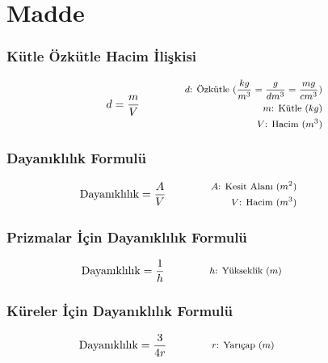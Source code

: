 \section{Madde}

\subsubsection*{Kütle Özkütle Hacim İlişkisi}

\begin{equation}
    d = \frac{m}{V} \qquad \qquad \parbox{4cm}{\footnotesize$
    \begin{aligned}
        d\text{: Özkütle } (\frac{kg}{m^3} = \frac{g}{dm^3} = \frac{mg}{cm^3}) \\
        m\text{: Kütle } (kg) \\
        V\text{: Hacim } (m^3)
    \end{aligned}$}
\end{equation}

\subsubsection*{Dayanıklılık Formulü}

\begin{equation}
    \text{Dayanıklılık} = \frac{A}{V} \qquad \qquad \parbox{4cm}{\footnotesize$
      \begin{aligned}
        A\text{: Kesit Alanı } (m^2) \\
        V\text{: Hacim } (m^3)
    \end{aligned}$}
\end{equation}

\subsubsection*{Prizmalar İçin Dayanıklılık Formulü}

\begin{equation}
    \text{Dayanıklılık} = \frac{1}{h} \qquad \qquad \parbox{4cm}{\footnotesize$
      \begin{aligned}
        h\text{: Yükseklik } (m)
    \end{aligned}$}
\end{equation}

\subsubsection*{Küreler İçin Dayanıklılık Formulü}

\begin{equation}
    \text{Dayanıklılık} = \frac{3}{4r} \qquad \qquad \parbox{4cm}{\footnotesize$
      \begin{aligned}
        r\text{: Yarıçap } (m)
    \end{aligned}$}
\end{equation}
